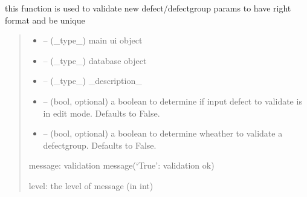 \documentclass[letterpaper,10pt,english]{sphinxmanual}
\begin{document}

\begin{savenotes}\begin{fulllineitems}
\label{\detokenize{setting/backend/defect_management_funcs:oxin.backend.defect_management_funcs.new_defect_info_validation}}
\pysigstartsignatures
{}
\pysigstopsignatures
\sphinxAtStartPar
this function is used to validate new defect/defect\sphinxhyphen{}group params to have right format and be unique
\begin{quote}\begin{description}
\begin{itemize}
\item {} 
\sphinxAtStartPar
{} – (\_type\_) main ui object

\item {} 
\sphinxAtStartPar
{} – (\_type\_) database object

\item {} 
\sphinxAtStartPar
{} – (\_type\_) \_description\_

\item {} 
\sphinxAtStartPar
{} – (bool, optional) a boolean to determine if input defect to validate is in edit mode. Defaults to False.

\item {} 
\sphinxAtStartPar
{} – (bool, optional) a boolean to determine wheather to validate a defect\sphinxhyphen{}group. Defaults to False.

\end{itemize}

\sphinxAtStartPar
message: validation message(‘True’: validation ok)

\sphinxAtStartPar
level: the level of message (in int)

\end{description}\end{quote}

\end{fulllineitems}\end{savenotes}
\end{document}
